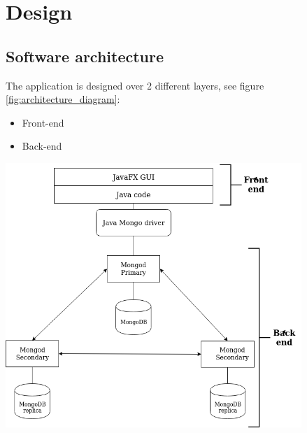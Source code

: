 \documentclass[a4paper, oneside]{article}
\begin{document}
\clearpage
\section{Design}

\subsection{Software architecture}
The application is designed over 2 different layers, see figure \ref{fig:architecture_diagram}:
\begin{itemize}
\item Front-end
\item Back-end
\end{itemize}
\vspace{5mm}
\begin{minipage}{\linewidth}
\begin{center}
\vspace{1mm}
\includegraphics[height = 100mm]{./images/diagrams/architecture_diagram.png} 
\vspace{6mm}
\label{fig:architecture_diagram}
\end{center}
\end{minipage}
\vspace{7mm}
\end{document}
